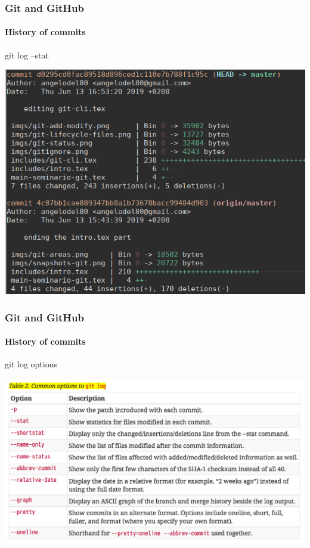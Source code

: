 \begin{frame}
	\frametitle{Git and GitHub}
    \framesubtitle{History of commits}
    \addtocounter{nframe}{1}

	\begin{block}{git log --stat}
		\begin{center}
			\includegraphics[width=.9\textwidth]{imgs/git-log-stats.png}
		\end{center}
	\end{block}

\end{frame}

\begin{frame}
	\frametitle{Git and GitHub}
    \framesubtitle{History of commits}
    \addtocounter{nframe}{1}

	\begin{block}{git log options}
		\begin{center}
			\includegraphics[width=.9\textwidth]{imgs/git-log-options.png}
		\end{center}
	\end{block}

\end{frame}

